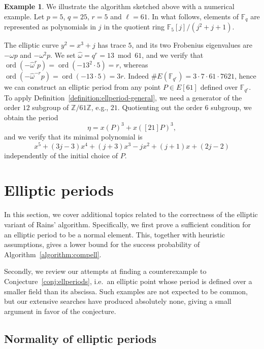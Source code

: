 \documentclass[12pt]{article}
\theoremstyle{plain}
\theoremstyle{definition}
\newtheorem{example}[theorem]{Example}
\DeclareMathOperator{\order}{ord} %
\def\Z{\ensuremath{\mathbb{Z}}}
\def\F{\ensuremath{\mathbb{F}}}
\newcounter{algorithm}
\begin{document}
\begin{example}
  We illustrate the algorithm sketched above with a numerical
  example. %
  Let $p=5$, $q=25$, $r=5$ and $\ell=61$. %
  In what follows, elements of $\F_q$ are represented as polynomials
  in $j$ in the quotient ring $\F_5[j]/(j^2+j+1)$. %

  The elliptic curve $y^2=x^3+j$ has trace $5$, and its two Frobenius
  eigenvalues are $-\omega p$ and $-\omega^2 p$. %
  We set $\hat\omega=q^r=13\bmod 61$, and we verify that
  $\order(-\hat\omega^r p)=\order(-13^2\cdot 5)=r$, whereas
  $\order(-\hat\omega^{-r} p)=\order(-13\cdot 5)=3r$. %
  Indeed $\#E(\F_{q^r})= 3\cdot7\cdot61\cdot7621$, hence we can
  construct an elliptic period from any point $P\in E[61]$ defined
  over $\F_{q^r}$. %
  To apply Definition~\ref{definition:ellperiod-general}, we need a
  generator of the order $12$ subgroup of $\Z/61\Z$, e.g., $21$. %
  Quotienting out the order $6$ subgroup, we obtain the period
  \begin{equation*}
    \eta = x(P)^3 + x([21]P)^3,
  \end{equation*}
  and we verify that its minimal polynomial is
  \begin{equation*}
    x^5 + (3j-3)x^4 + (j+3)x^3 -jx^2 + (j+1)x + (2j-2)    
  \end{equation*}
  independently of the initial choice of $P$.
\end{example}



\section{Elliptic periods}
\label{app:ellprdsdata}

In this section, we cover additional topics related to the correctness
of the elliptic variant of Rains' algorithm. %
Specifically, we first prove a sufficient condition for an elliptic
period to be a normal element. %
This, together with heuristic assumptions, gives a lower bound for the
success probability of Algorithm~\ref{algorithm:compell}. %

Secondly, we review our attempts at finding a counterexample to
Conjecture~\ref{conj:ellperiods}, i.e.\ an elliptic point whose period
is defined over a smaller field than its abscissa. %
Such examples are not expected to be common, but our extensive
searches have produced absolutely none, giving a small argument in
favor of the conjecture.


\subsection{Normality of elliptic periods}
\end{document}
